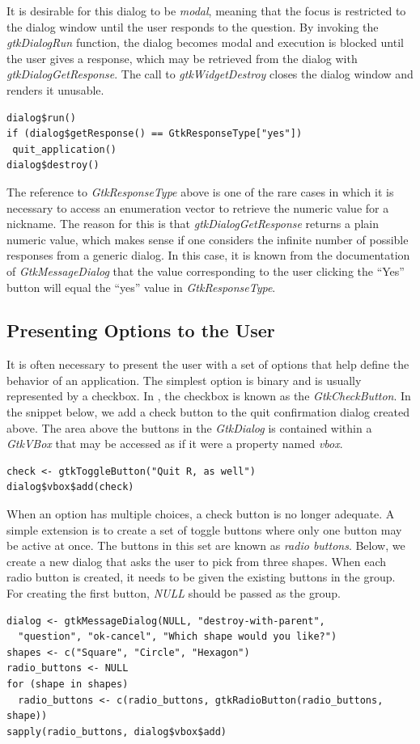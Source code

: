 \documentclass[article]{jss}
\begin{document}
It is desirable for this dialog to be \emph{modal}, meaning that the focus
is restricted to the dialog window until the user responds to the question. By
invoking the \emph{gtkDialogRun} function, the dialog becomes modal and execution
is blocked until the user gives a response, which may be retrieved from the 
dialog with \emph{gtkDialogGetResponse}. The call to \emph{gtkWidgetDestroy}
closes the dialog window and renders it unusable.
\begin{verbatim}
dialog$run()
if (dialog$getResponse() == GtkResponseType["yes"])
 quit_application()
dialog$destroy()
\end{verbatim}
The reference to \emph{GtkResponseType} above is one of the rare cases in which
it is necessary to access an enumeration vector to retrieve the numeric value
for a nickname. The reason for this is that \emph{gtkDialogGetResponse} returns
a plain numeric value, which makes sense if one considers the infinite number
of possible responses from a generic dialog. In this case, it is known from
the documentation of \emph{GtkMessageDialog} that the value corresponding to
the user clicking the ``Yes'' button will equal the ``yes'' value in \emph{GtkResponseType}.

\subsection{Presenting Options to the User}
It is often necessary to present the user with a set of options that help
define the behavior of an application. The simplest option is binary and is
usually represented by a checkbox. In , the checkbox is known as
the \emph{GtkCheckButton}. In the snippet below, we add a check button
to the quit confirmation dialog created above. The area above the buttons in the 
\emph{GtkDialog} is contained within a \emph{GtkVBox} that may be accessed
as if it were a property named \emph{vbox}.
\begin{verbatim}
check <- gtkToggleButton("Quit R, as well")
dialog$vbox$add(check)
\end{verbatim}

When an option has multiple choices, a check button is no longer adequate. A
simple extension is to create a set of toggle buttons where only one button
may be active at once. The buttons in this set are known as \emph{radio buttons}.
Below, we create a new dialog that asks the user to pick from three shapes.
When each radio button is created, it needs to be given the existing buttons
in the group. For creating the first button, \emph{NULL} should be passed as the group.
\begin{verbatim}
dialog <- gtkMessageDialog(NULL, "destroy-with-parent", 
  "question", "ok-cancel", "Which shape would you like?")
shapes <- c("Square", "Circle", "Hexagon")
radio_buttons <- NULL
for (shape in shapes)
  radio_buttons <- c(radio_buttons, gtkRadioButton(radio_buttons, shape))
sapply(radio_buttons, dialog$vbox$add)
\end{verbatim}
\end{document}
